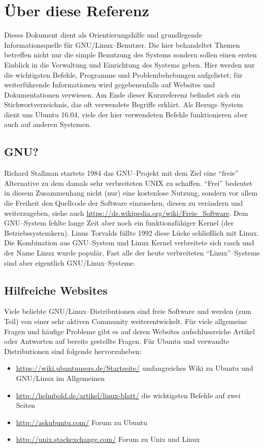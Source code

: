 \section {Über diese Referenz}
Dieses Dokument dient als Orientierungshilfe und grundlegende Informationsquelle für GNU/Linux--Benutzer. Die hier behandeltet Themen betreffen nicht nur die simple Benutzung des Systems sondern sollen einen ersten Einblick in die Verwaltung und Einrichtung des Systems geben. Hier werden nur die wichtigsten Befehle, Programme und Problembehebungen aufgelistet; für weiterführende Informationen wird gegebenenfalls auf Websites und Dokumentationen verwiesen. Am Ende dieser Kurzreferenz befindet sich ein Stichwortverzeichnis, das oft verwendete Begriffe erklärt. Als Bezugs--System dient uns Ubuntu 16.04, viele der hier verwendeten Befehle funktionieren aber auch auf anderen Systemen.

\subsection{GNU?}
Richard Stallman startete 1984 das GNU--Projekt mit dem Ziel eine ``freie'' Alternative zu dem damals sehr verbreiteten UNIX zu schaffen. ``Frei'' bedeutet in diesem Zusammenhang nicht (nur) eine kostenlose Nutzung, sondern vor allem die Freiheit den Quellcode der Software einzusehen, diesen zu verändern und weiterzugeben, siehe auch \url{https://de.wikipedia.org/wiki/Freie_Software}. Dem GNU--System fehlte lange Zeit aber noch ein funktionsfähiger Kernel (der Betriebssystemkern). Linus Torvalds füllte 1992 diese Lücke schließlich mit Linux. Die Kombination aus GNU--System und Linux Kernel verbreitete sich rasch und der Name Linux wurde populär. Fast alle der heute verbreiteten ``Linux''--Systeme sind aber eigentlich GNU/Linux--Systeme.

\subsection {Hilfreiche Websites}
Viele beliebte GNU/Linux--Distributionen sind freie Software und werden (zum Teil) von einer sehr aktiven Community weiterentwickelt. Für viele allgemeine Fragen und häufige Probleme gibt es auf deren Websites aufschlussreiche Artikel oder Antworten auf bereits gestellte Fragen. Für Ubuntu und verwandte Distributionen sind folgende hervorzuheben:

\begin{itemize}
	\item \url{https://wiki.ubuntuusers.de/Startseite/} umfangreiches Wiki zu Ubuntu und GNU/Linux im Allgemeinen
	\item \url{http://helmbold.de/artikel/linux-blatt/} die wichtigsten Befehle auf zwei Seiten
	\item \url{http://askubuntu.com/} Forum zu Ubuntu
	\item \url{http://unix.stackexchange.com/} Forum zu Unix und Linux
	
\end{itemize}
